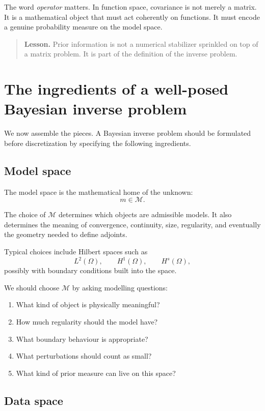 \documentclass[11pt,a4paper]{book}
\newenvironment{lesson}
  {\begin{quote}\textbf{Lesson.}}
  {\end{quote}}
\newcommand{\M}{\mathcal{M}}      %
\begin{document}
The word \emph{operator} matters. In function space, covariance is not merely a
matrix. It is a mathematical object that must act coherently on functions. It
must encode a genuine probability measure on the model space.

\begin{lesson}
Prior information is not a numerical stabilizer sprinkled on top of a matrix
problem. It is part of the definition of the inverse problem.
\end{lesson}

\section{The ingredients of a well-posed Bayesian inverse problem}

We now assemble the pieces. A Bayesian inverse problem should be formulated
before discretization by specifying the following ingredients.

\subsection{Model space}

The model space is the mathematical home of the unknown:
\[
    m \in \M.
\]

The choice of $\M$ determines which objects are admissible models. It also
determines the meaning of convergence, continuity, size, regularity, and
eventually the geometry needed to define adjoints.

Typical choices include Hilbert spaces such as
\[
    L^2(\Omega),
    \qquad
    H^1(\Omega),
    \qquad
    H^s(\Omega),
\]
possibly with boundary conditions built into the space.

We should choose $\M$ by asking modelling questions:
\begin{enumerate}[label=\arabic*.]
    \item What kind of object is physically meaningful?
    \item How much regularity should the model have?
    \item What boundary behaviour is appropriate?
    \item What perturbations should count as small?
    \item What kind of prior measure can live on this space?
\end{enumerate}

\subsection{Data space}
\end{document}
